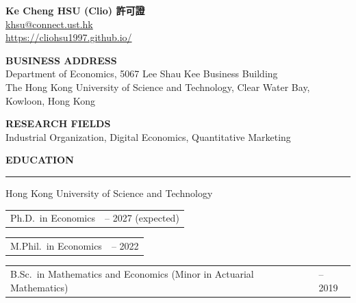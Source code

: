 \documentclass[11pt,letterpaper]{article}
\makeatletter
\newlength{\cvdatecol}
\newcommand{\sectionheader}[1]{%
  \vspace{0.55em}
  {\large\bfseries #1}\\[-0.15em]
  \rule{\textwidth}{0.4pt}\par
  \vspace{0.25em}
}
\newcommand{\cvline}[3][0em]{%
  \par\nobreak
  \noindent\hspace*{#1}%
  \begin{tabularx}{\dimexpr\textwidth-#1\relax}{@{}X@{\hspace{0.75em}}>{\raggedleft\arraybackslash}p{\cvdatecol}@{}}
  #2 & #3 \\
  \end{tabularx}%
}
\makeatother
\begin{document}
\begin{center}
{\LARGE\bfseries Ke Cheng HSU (Clio) 許可證}\\[0.55em]
\href{mailto:khsu@connect.ust.hk}{khsu@connect.ust.hk}\\[0.2em]
\href{https://cliohsu1997.github.io}{https://cliohsu1997.github.io/}
\end{center}

\vspace{0.7em}

\textbf{BUSINESS ADDRESS}\\[0.2em]
\hspace{1.5em} Department of Economics, 5067 Lee Shau Kee Business Building\\
\hspace{1.5em} The Hong Kong University of Science and Technology, Clear Water Bay, Kowloon, Hong Kong

\vspace{0.55em}

\textbf{RESEARCH FIELDS}\\[0.2em]
\hspace{1.5em} Industrial Organization, Digital Economics, Quantitative Marketing

\sectionheader{EDUCATION}
{
Hong Kong University of Science and Technology\\[-0.35em]
\cvline[1.5em]{Ph.D.\ in Economics}{2022 -- 2027 (expected)}
\vspace{-0.15em}
\cvline[1.5em]{M.Phil.\ in Economics}{2020 -- 2022}
\vspace{-0.15em}
\cvline[1.5em]{B.Sc.\ in Mathematics and Economics (Minor in Actuarial Mathematics)}{2015 -- 2019}
}
\end{document}
